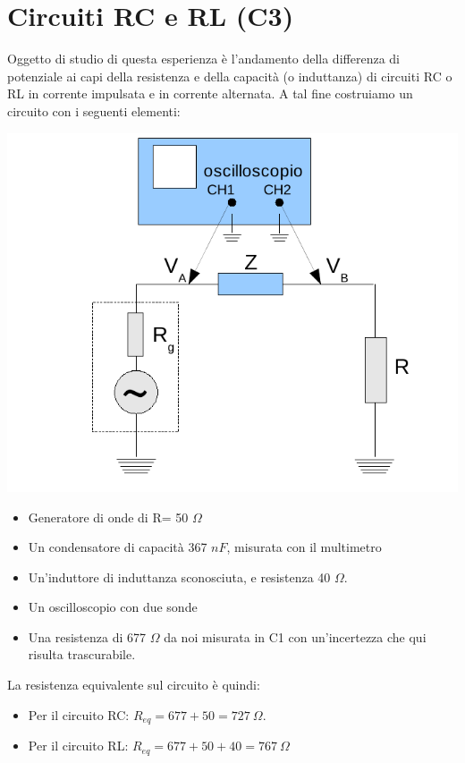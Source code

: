\chapter{Circuiti RC e RL (C3)}

Oggetto di studio di questa esperienza è l'andamento della differenza di potenziale ai capi della resistenza e della capacità (o induttanza) di circuiti RC o RL in corrente impulsata e in corrente alternata.
A tal fine costruiamo un circuito con i seguenti elementi:

\begin{center}
 \includegraphics[scale=0.70]{grafici/C3/schema.png}
\end{center}

\begin{itemize}
  \item Generatore di onde di R= 50 $\Omega$
  \item Un condensatore di capacità 367 $nF$, misurata con il multimetro
  \item Un'induttore di induttanza sconosciuta, e resistenza 40 $\Omega$.
  \item Un oscilloscopio con due sonde
  \item Una resistenza di 677 $\Omega$ da noi misurata in C1 con un'incertezza che qui risulta trascurabile. 
\end{itemize}
La resistenza equivalente sul circuito è quindi:
\begin{itemize}
 \item Per il circuito RC: $R_{eq} = 677+50 = 727\ \Omega$.
 \item Per il circuito RL: $R_{eq} = 677+50+40 = 767\ \Omega$
\end{itemize}


